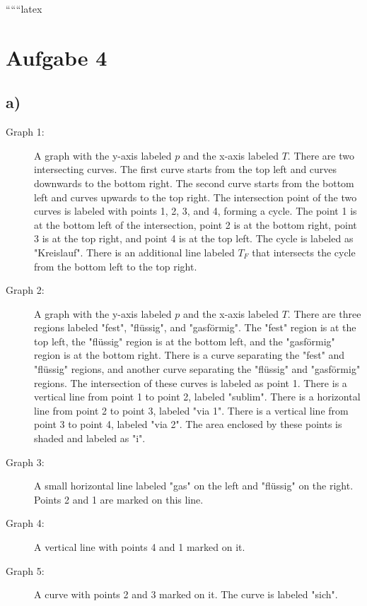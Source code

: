 
``````latex


\section*{Aufgabe 4}

\subsection*{a)}

\begin{description}
    \item[Graph 1:] A graph with the y-axis labeled \( p \) and the x-axis labeled \( T \). There are two intersecting curves. The first curve starts from the top left and curves downwards to the bottom right. The second curve starts from the bottom left and curves upwards to the top right. The intersection point of the two curves is labeled with points 1, 2, 3, and 4, forming a cycle. The point 1 is at the bottom left of the intersection, point 2 is at the bottom right, point 3 is at the top right, and point 4 is at the top left. The cycle is labeled as "Kreislauf". There is an additional line labeled \( T_F \) that intersects the cycle from the bottom left to the top right.
    
    \item[Graph 2:] A graph with the y-axis labeled \( p \) and the x-axis labeled \( T \). There are three regions labeled "fest", "flüssig", and "gasförmig". The "fest" region is at the top left, the "flüssig" region is at the bottom left, and the "gasförmig" region is at the bottom right. There is a curve separating the "fest" and "flüssig" regions, and another curve separating the "flüssig" and "gasförmig" regions. The intersection of these curves is labeled as point 1. There is a vertical line from point 1 to point 2, labeled "sublim". There is a horizontal line from point 2 to point 3, labeled "via 1". There is a vertical line from point 3 to point 4, labeled "via 2". The area enclosed by these points is shaded and labeled as "i".
    
    \item[Graph 3:] A small horizontal line labeled "gas" on the left and "flüssig" on the right. Points 2 and 1 are marked on this line.
    
    \item[Graph 4:] A vertical line with points 4 and 1 marked on it.
    
    \item[Graph 5:] A curve with points 2 and 3 marked on it. The curve is labeled "sich".
\end{description}

